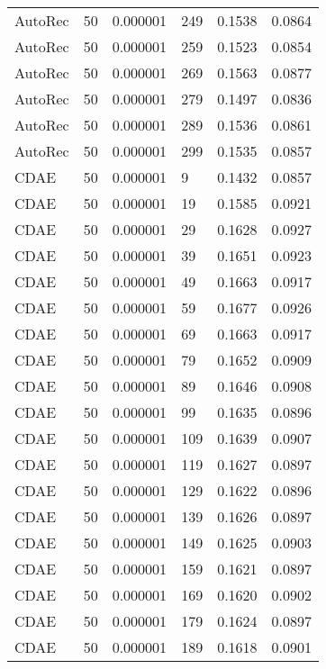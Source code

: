 \begin{tabular}{llrlrr}
 AutoRec &   50 &  0.000001 &   249 &  0.1538 &       0.0864 \\
 AutoRec &   50 &  0.000001 &   259 &  0.1523 &       0.0854 \\
 AutoRec &   50 &  0.000001 &   269 &  0.1563 &       0.0877 \\
 AutoRec &   50 &  0.000001 &   279 &  0.1497 &       0.0836 \\
 AutoRec &   50 &  0.000001 &   289 &  0.1536 &       0.0861 \\
 AutoRec &   50 &  0.000001 &   299 &  0.1535 &       0.0857 \\
    CDAE &   50 &  0.000001 &     9 &  0.1432 &       0.0857 \\
    CDAE &   50 &  0.000001 &    19 &  0.1585 &       0.0921 \\
    CDAE &   50 &  0.000001 &    29 &  0.1628 &       0.0927 \\
    CDAE &   50 &  0.000001 &    39 &  0.1651 &       0.0923 \\
    CDAE &   50 &  0.000001 &    49 &  0.1663 &       0.0917 \\
    CDAE &   50 &  0.000001 &    59 &  0.1677 &       0.0926 \\
    CDAE &   50 &  0.000001 &    69 &  0.1663 &       0.0917 \\
    CDAE &   50 &  0.000001 &    79 &  0.1652 &       0.0909 \\
    CDAE &   50 &  0.000001 &    89 &  0.1646 &       0.0908 \\
    CDAE &   50 &  0.000001 &    99 &  0.1635 &       0.0896 \\
    CDAE &   50 &  0.000001 &   109 &  0.1639 &       0.0907 \\
    CDAE &   50 &  0.000001 &   119 &  0.1627 &       0.0897 \\
    CDAE &   50 &  0.000001 &   129 &  0.1622 &       0.0896 \\
    CDAE &   50 &  0.000001 &   139 &  0.1626 &       0.0897 \\
    CDAE &   50 &  0.000001 &   149 &  0.1625 &       0.0903 \\
    CDAE &   50 &  0.000001 &   159 &  0.1621 &       0.0897 \\
    CDAE &   50 &  0.000001 &   169 &  0.1620 &       0.0902 \\
    CDAE &   50 &  0.000001 &   179 &  0.1624 &       0.0897 \\
    CDAE &   50 &  0.000001 &   189 &  0.1618 &       0.0901 \\

\end{tabular}

